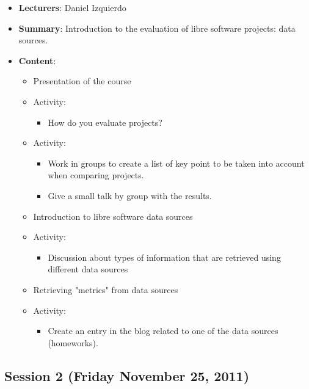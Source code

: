 \documentclass[a4paper]{article}
\begin{document}
\begin{itemize}
 \item \textbf{Lecturers}: Daniel Izquierdo
 \item \textbf{Summary}: Introduction to the evaluation of libre software projects: data sources.
 \item \textbf{Content}:

    \begin{itemize}
      \item Presentation of the course
      \item Activity:
        \begin{itemize}
          \item How do you evaluate projects?
        \end{itemize}
      \item Activity:
        \begin{itemize}
          \item Work in groups to create a list of key point to be taken into account when comparing projects.
          \item Give a small talk by group with the results.  
        \end{itemize}
      \item Introduction to libre software data sources
      \item Activity:
        \begin{itemize}
          \item Discussion about types of information that are retrieved using different data sources
        \end{itemize}
       \item Retrieving "metrics" from data sources
       \item Activity:
         \begin{itemize} 
           \item Create an entry in the blog related to one of the data sources (homeworks).
         \end{itemize}
    \end{itemize}

   
\end{itemize}


\subsection{Session 2 (Friday November 25, 2011)}
\end{document}
